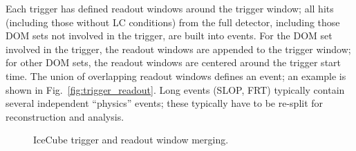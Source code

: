 Each trigger has defined readout windows around the trigger window;
all hits (including those without LC conditions) from the full detector,
including those DOM sets not involved in the trigger, are built into
events.  For the DOM set involved in the trigger, the readout 
windows are appended to the trigger window; for other DOM sets, the readout
windows are centered around the trigger start time.  The union of
overlapping readout windows defines an event; an example is shown in
Fig.~\ref{fig:trigger_readout}.  Long events (SLOP, FRT) typically contain several
independent ``physics'' events; these typically have to be re-split for
reconstruction and analysis.

\begin{figure}[ht]
  \centering
  \quad
  \caption{IceCube trigger and readout window merging.}
\end{figure}

